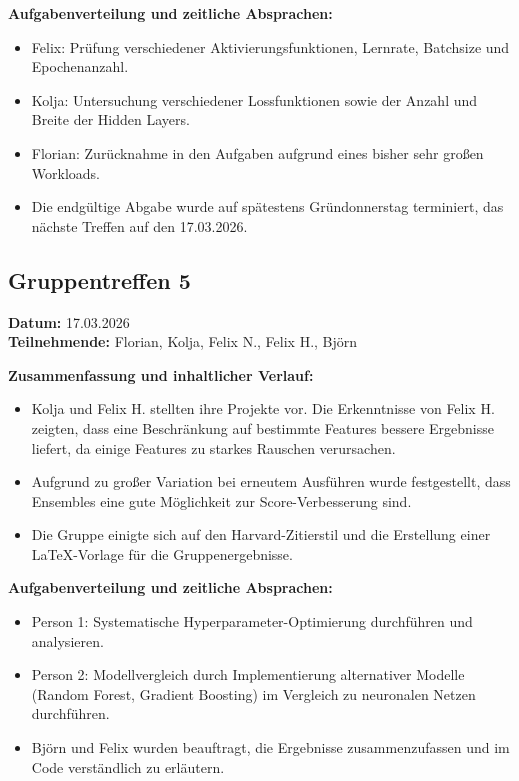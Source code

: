 \documentclass[9pt,a4paper,twocolumn,twoside]{tau-class/tau}
\begin{document}
\textbf{Aufgabenverteilung und zeitliche Absprachen:}
\begin{itemize}
    \item Felix: Prüfung verschiedener Aktivierungsfunktionen, Lernrate, Batchsize und Epochenanzahl.
    \item Kolja: Untersuchung verschiedener Lossfunktionen sowie der Anzahl und Breite der Hidden Layers.
    \item Florian: Zurücknahme in den Aufgaben aufgrund eines bisher sehr großen Workloads.
    \item Die endgültige Abgabe wurde auf spätestens Gründonnerstag terminiert, das nächste Treffen auf den 17.03.2026.
\end{itemize}

\subsection*{Gruppentreffen 5}
\textbf{Datum:} 17.03.2026 \\
\textbf{Teilnehmende:} Florian, Kolja, Felix N., Felix H., Björn

\textbf{Zusammenfassung und inhaltlicher Verlauf:}
\begin{itemize}
    \item Kolja und Felix H. stellten ihre Projekte vor. Die Erkenntnisse von Felix H. zeigten, dass eine Beschränkung auf bestimmte Features bessere Ergebnisse liefert, da einige Features zu starkes Rauschen verursachen.
    \item Aufgrund zu großer Variation bei erneutem Ausführen wurde festgestellt, dass Ensembles eine gute Möglichkeit zur Score-Verbesserung sind.
    \item Die Gruppe einigte sich auf den Harvard-Zitierstil und die Erstellung einer LaTeX-Vorlage für die Gruppenergebnisse.
\end{itemize}

\textbf{Aufgabenverteilung und zeitliche Absprachen:}
\begin{itemize}
    \item Person 1: Systematische Hyperparameter-Optimierung durchführen und analysieren.
    \item Person 2: Modellvergleich durch Implementierung alternativer Modelle (Random Forest, Gradient Boosting) im Vergleich zu neuronalen Netzen durchführen.
    \item Björn und Felix wurden beauftragt, die Ergebnisse zusammenzufassen und im Code verständlich zu erläutern.
\end{itemize}
\end{document}
